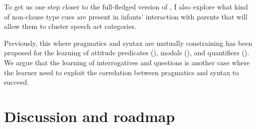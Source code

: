 
To get us one step closer to the full-fledged version of \hypos{}, I also explore what kind of non-clause type cues are present in infants' interaction with parents that will allow them to cluster speech act categories. 

Previously, this \hypos{} where pragmatics and syntax are mutually constraining has been proposed for the learning of attitude predicates (\citealt{lewis2017think, dudleyetal2018, hacquardlidz2018}), modals (\citealt{dieuleveut2021}), and quantifiers (\citealt{knowlton2021}). We argue that the learning of interrogatives and questions is another case where the learner need to exploit the correlation between pragmatics and syntax to succeed.  







\section{Discussion and roadmap}
\label{sec:intro:roadmap}

